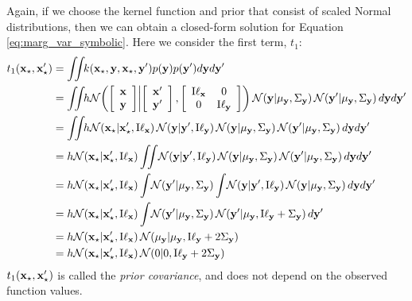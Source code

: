 %
Again, if we choose the kernel function and prior that consist of scaled Normal distributions, then we can obtain a closed-form solution for Equation \eqref{eq:marg_var_symbolic}.  Here we consider the first term, $t_1$:
%
\begin{align}
t_1(\vx\st, \vx\st') & = \int\!\!\! \int\!\! k(\vx\st, \vy, \vx\st, \vy') p(\vy) p(\vy') d\vy d\vy' \\
 & = \int\!\!\! \int\!\! h \N{ \colvec{\vx}{\vy} }{ \colvec{\vx'}{\vy'} }{  \tbtmat{ {\text I} \vell_\vx }{ 0 }{ 0 }{ {\text I} \vell_\vy} } \N{\vy}{\mu_\vy}{\Sigma_\vy} \N{\vy'}{\mu_\vy}{\Sigma_\vy} d\vy  d\vy'\\
& = \int\!\!\! \int\!\! h \N{\vx\st}{\vx\st'}{ {\text I} \vell_\vx } \N{ \vy } {\vy'}{ {\text I} \vell_\vy } \N{\vy}{\mu_\vy}{\Sigma_\vy} \N{\vy'}{\mu_\vy}{\Sigma_\vy} d\vy  d\vy'\\
& = h \N{ \vx\st } {\vx\st'}{ {\text I} \vell_\vx } \int\!\!\! \int\! \N{ \vy } {\vy'}{ {\text I} \vell_\vy } \N{\vy}{\mu_\vy}{\Sigma_\vy} \N{\vy'}{\mu_\vy}{\Sigma_\vy} d\vy  d\vy'\\
& = h \N{\vx\st}{\vx\st'}{ {\text I} \vell_\vx } \int\! \N{\vy'}{\mu_\vy}{\Sigma_\vy} \int\! \N{ \vy } {\vy'}{ {\text I} \vell_\vy } \N{\vy}{\mu_\vy}{\Sigma_\vy} d\vy  d\vy'\\
& = h \N{\vx\st}{\vx\st'}{ {\text I} \vell_\vx } \int\! \N{\vy'}{\mu_\vy}{\Sigma_\vy} \N{ \vy' } {\mu_\vy}{ {\text I} \vell_\vy + \Sigma_\vy}  d\vy'\\
& = h \N{\vx\st}{\vx\st'}{ {\text I} \vell_\vx } \N{\mu_\vy}{\mu_\vy}{ {\text I} \vell_\vy + 2\Sigma_\vy} \\
& = h \N{\vx\st}{\vx\st'}{ {\text I} \vell_\vx } \N{0}{0}{ {\text I} \vell_\vy + 2\Sigma_\vy}
\label{eq:var_double_integral_t1}
\end{align}
$t_1({\bf{x}}_\star, {\bf{x}}_\star')$ is called the \textit{prior covariance}, and does not depend on the observed function values.


